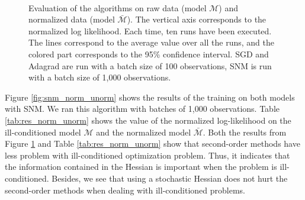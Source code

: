 \documentclass[conference]{IEEEtran}
\begin{document}
\begin{figure}[t]
\vspace{-0.4cm}
    \centering
    ~
    ~
    \vspace{-0.2cm}
    \caption{Evaluation of the algorithms on raw data (model $\mathcal{M}$) and normalized data (model $\bar{\mathcal{M}}$). The vertical axis corresponds to the normalized log likelihood. Each time, ten runs have been executed. The lines correspond to the average value over all the runs, and the colored part corresponds to the 95\% confidence interval. SGD and Adagrad are run with a batch size of 100 observations, SNM is run with a batch size of 1,000 observations.}
    \label{fig:norm_unorm}
    \vspace{-0.5cm}
\end{figure}

Figure \ref{fig:snm_norm_unorm} shows the results of the training on both models with SNM. We ran this algorithm with batches of 1,000 observations. Table \ref{tab:res_norm_unorm} shows the value of the normalized log-likelihood on the ill-conditioned model $\mathcal{M}$ and the normalized model $\bar{\mathcal{M}}$. Both the results from Figure \ref{fig:norm_unorm} and Table \ref{tab:res_norm_unorm} show that second-order methods have less problem with ill-conditioned optimization problem. Thus, it indicates that the information contained in the Hessian is important when the problem is ill-conditioned. Besides, we see that using a stochastic Hessian does not hurt the second-order methods when dealing with ill-conditioned problems.
\end{document}
